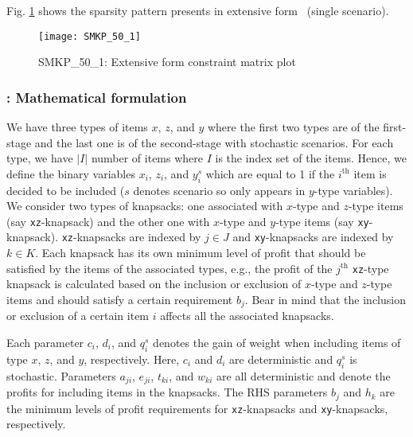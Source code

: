 Fig. \ref{fig:smkp_sparsity} shows the sparsity pattern presents in extensive form \smkp\ (single scenario).
\begin{figure}[H]
	\centering
	\texttt{[image: SMKP\_50\_1]}
	\caption{SMKP\_50\_1: Extensive form constraint matrix plot}
	\label{fig:smkp_sparsity}
\end{figure}

\subsubsection{\smkp: Mathematical formulation}
We have three types of items $x$, $z$, and $y$ where the first two types are of the first-stage and the last one is of the second-stage with stochastic scenarios. For each type, we have $|I|$ number of items where $I$ is the index set of the items. Hence, we define the binary variables $x_i$, $z_i$, and $y_i^s$ which are equal to 1 if the $i^{\mathrm{th}}$ item is decided to be included ($s$ denotes scenario so only appears in $y$-type variables). We consider two types of knapsacks: one associated with $x$-type and $z$-type items (say \texttt{xz}-knapsack) and the other one with $x$-type and $y$-type items (say \texttt{xy}-knapsack). \texttt{xz}-knapsacks are indexed by $j\in J$ and \texttt{xy}-knapsacks are indexed by $k\in K$.  Each knapsack has its own minimum level of profit that should be satisfied by the items of the associated types, e.g., the profit of the $j^{\mathrm{th}}$ \texttt{xz}-type knapsack is calculated based on the inclusion or exclusion of $x$-type and $z$-type items and should satisfy a certain requirement $b_j$. Bear in mind that the inclusion or exclusion of a certain item $i$ affects all the associated knapsacks.
 
Each parameter $c_i$, $d_i$, and $q_i^s$ denotes the gain of weight when including items of type $x$, $z$, and $y$, respectively. Here, $c_i$ and $d_i$ are deterministic and $q_i^s$ is stochastic. Parameters $a_{ji}$, $e_{ji}$, $t_{ki}$, and $w_{ki}$ are all deterministic and denote the profits for including items in the knapsacks. The RHS parameters $b_j$ and $h_k$ are the minimum levels of profit requirements for \texttt{xz}-knapsacks and \texttt{xy}-knapsacks, respectively.

